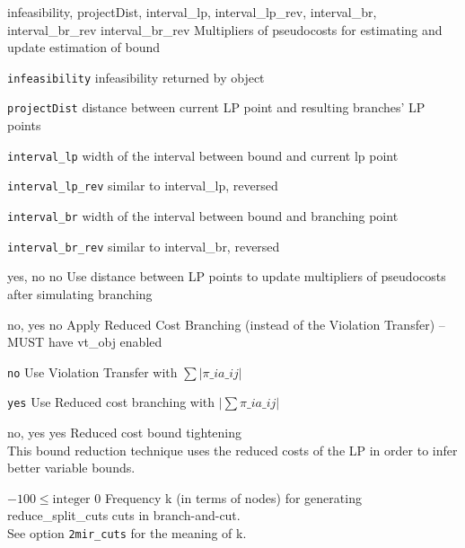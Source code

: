 %
{\ttfamily infeasibility, projectDist, interval\_lp, interval\_lp\_rev, interval\_br, interval\_br\_rev}%
{interval\_br\_rev}%
{Multipliers of pseudocosts for estimating and update estimation of bound}%
{\begin{list}{}{
\setlength{\parsep}{0em}
\setlength{\leftmargin}{5ex}
\setlength{\labelwidth}{2ex}
\setlength{\itemindent}{0ex}
\setlength{\topsep}{0pt}}
\item[\texttt{infeasibility}] infeasibility returned by object
\item[\texttt{projectDist}] distance between current LP point and resulting branches' LP points
\item[\texttt{interval\_lp}] width of the interval between bound and current lp point
\item[\texttt{interval\_lp\_rev}] similar to interval\_lp, reversed
\item[\texttt{interval\_br}] width of the interval between bound and branching point
\item[\texttt{interval\_br\_rev}] similar to interval\_br, reversed
\end{list}
}

%
{\ttfamily yes, no}%
{no}%
{Use distance between LP points to update multipliers of pseudocosts after simulating branching}%
{}

%
{\ttfamily no, yes}%
{no}%
{Apply Reduced Cost Branching (instead of the Violation Transfer) -- MUST have vt\_obj enabled}%
{\begin{list}{}{
\setlength{\parsep}{0em}
\setlength{\leftmargin}{5ex}
\setlength{\labelwidth}{2ex}
\setlength{\itemindent}{0ex}
\setlength{\topsep}{0pt}}
\item[\texttt{no}] Use Violation Transfer with $\sum |\pi\_i a\_{ij}|$
\item[\texttt{yes}] Use Reduced cost branching with $|\sum \pi\_i a\_{ij}|$
\end{list}
}

%
{\ttfamily no, yes}%
{yes}%
{Reduced cost bound tightening\\
This bound reduction technique uses the reduced costs of the LP in order to infer better variable bounds.}%
{}

%
{$-100\leq\textrm{integer}$}%
{$0$}%
{Frequency k (in terms of nodes) for generating reduce\_split\_cuts cuts in branch-and-cut.\\
See option \texttt{2mir\_cuts} for the meaning of k.}%
{}

